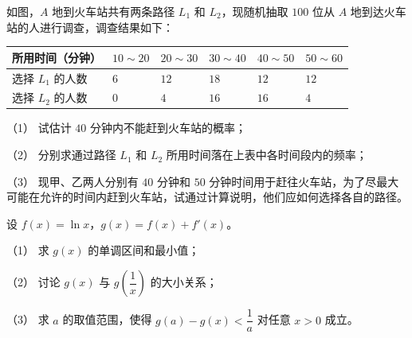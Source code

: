 \begin{question}
如图，$A$ 地到火车站共有两条路径 $L_1$ 和 $L_2$，现随机抽取 $100$ 位从 $A$ 地到达火车站的人进行调查，调查结果如下：

\begin{center}
\begin{tabular}{llllll}
\toprule
所用时间（分钟） & $10\sim20$ & $20\sim30$ & $30\sim40$ & $40\sim50$ & $50\sim60$ \\
\midrule
选择 $L_1$ 的人数 & $6$ & $12$ & $18$ & $12$ & $12$ \\
选择 $L_2$ 的人数 & $0$ & $4$ & $16$ & $16$ & $4$ \\
\bottomrule
\end{tabular}
\end{center}

（1） 试估计 $40$ 分钟内不能赶到火车站的概率；

（2） 分别求通过路径 $L_1$ 和 $L_2$ 所用时间落在上表中各时间段内的频率；

（3） 现甲、乙两人分别有 $40$ 分钟和 $50$ 分钟时间用于赶往火车站，为了尽最大可能在允许的时间内赶到火车站，试通过计算说明，他们应如何选择各自的路径。
\nopagebreak[4]
\begin{center}\end{center}
\nopagebreak[4]
\end{question}
\begin{question}
设 $f(x)=\ln x$，$g(x)=f(x)+f'(x)$。

（1） 求 $g(x)$ 的单调区间和最小值；

（2） 讨论 $g(x)$ 与 $g\left(\dfrac1x\right)$ 的大小关系；

（3） 求 $a$ 的取值范围，使得 $g(a)-g(x)<\dfrac1a$ 对任意 $x>0$ 成立。

\clearpage

\end{question}